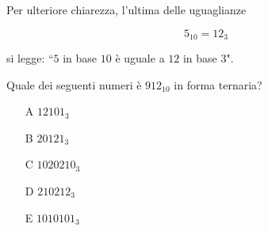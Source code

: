 \begin{enumerate}
Per ulteriore chiarezza, l'ultima delle uguaglianze

\begin{equation*}
5_{10} = 12_3
\end{equation*}

si legge: ``$5$ in base $10$ è uguale a $12$ in base $3$".

Quale dei seguenti numeri è $912_{10}$ in forma ternaria?

\begin{itemize}
\item[A] 
$12101_3$
\item[B]
$20121_3$
\item[C]
$1020210_3$
\item[D]
$210212_3$
\item[E]
$1010101_3$
\end{itemize}



\end{enumerate}

